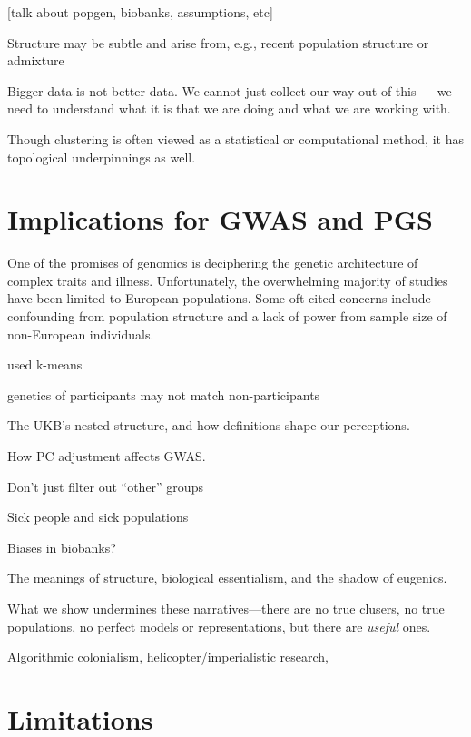 [talk about popgen, biobanks, assumptions, etc]


Structure may be subtle and arise from, e.g., recent population structure or admixture\citep{gopalan_human_2022}

Bigger data is not better data. We cannot just collect our way out of this --- we need to understand what it is that we are doing and what we are working with.



Though clustering is often viewed as a statistical or computational method, it has topological underpinnings as well.



\section{Implications for GWAS and PGS}

One of the promises of genomics is deciphering the genetic architecture of complex traits and illness. Unfortunately, the overwhelming majority of studies have been limited to European populations\citep{fatumo_roadmap_2022}\citep{kaplan_polygenic_2022}. Some oft-cited concerns include confounding from population structure and a lack of power from sample size of non-European individuals\citep{ben-eghan_dont_2020}. 

used k-means\citep{sun_analyses_2022}

genetics of participants may not match non-participants
\citep{benonisdottir_studying_2023}

The UKB's nested structure, and how definitions shape our perceptions.

How PC adjustment affects GWAS.

Don't just filter out ``other'' groups

Sick people and sick populations\citep{rose_sick_2001}

Biases in biobanks?

The meanings of structure, biological essentialism, and the shadow of eugenics.

What we show undermines these narratives---there are no true clusers, no true populations, no perfect models or representations, but there are \textit{useful} ones.

Algorithmic colonialism, helicopter/imperialistic research, 

\citep{gebru_race_2020}


\section{Limitations}

